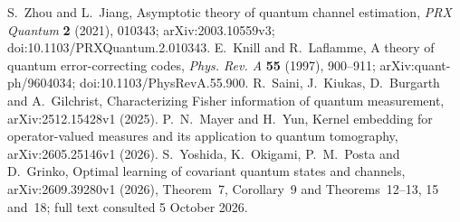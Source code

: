  S.~Zhou and L.~Jiang,
Asymptotic theory of quantum channel estimation,
\emph{PRX Quantum} \textbf{2} (2021), 010343;
arXiv:2003.10559v3; doi:10.1103/PRXQuantum.2.010343.
 E.~Knill and R.~Laflamme,
A theory of quantum error-correcting codes,
\emph{Phys. Rev. A} \textbf{55} (1997), 900--911;
arXiv:quant-ph/9604034; doi:10.1103/PhysRevA.55.900.
 R.~Saini, J.~Kiukas, D.~Burgarth and A.~Gilchrist,
Characterizing Fisher information of quantum measurement,
arXiv:2512.15428v1 (2025).
 P.~N.~Mayer and H.~Yun,
Kernel embedding for operator-valued measures and its application to
quantum tomography, arXiv:2605.25146v1 (2026).
 S.~Yoshida, K.~Okigami, P.~M.~Posta and D.~Grinko,
Optimal learning of covariant quantum states and channels,
arXiv:2609.39280v1 (2026), Theorem~7, Corollary~9 and
Theorems~12--13, 15 and~18; full text consulted 5 October 2026.
